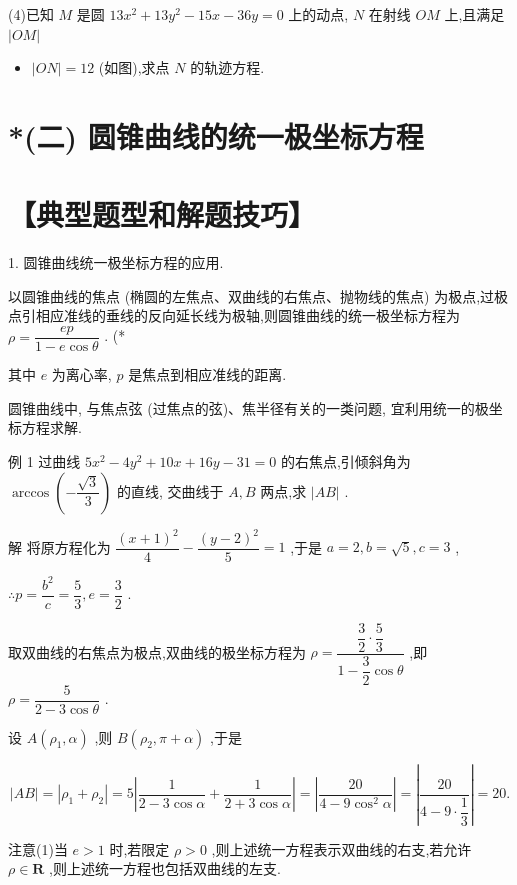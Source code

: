 (4)已知 $M$ 是圆 ${13}{x}^{2} + {13}{y}^{2} - {15x} - {36y} = 0$ 上的动点, $N$ 在射线 ${OM}$ 上,且满足 $\left| {OM}\right|$

\begin{itemize}
\item $\left| {ON}\right|  = {12}$ (如图),求点 $N$ 的轨迹方程.
\end{itemize}

\section*{*(二) 圆锥曲线的统一极坐标方程}

\section*{【典型题型和解题技巧】}

1. 圆锥曲线统一极坐标方程的应用.

以圆锥曲线的焦点 (椭圆的左焦点、双曲线的右焦点、抛物线的焦点) 为极点,过极点引相应准线的垂线的反向延长线为极轴,则圆锥曲线的统一极坐标方程为 $\rho  = \dfrac{ep}{1 - e\cos \theta }$ . (*

其中 $e$ 为离心率, $p$ 是焦点到相应准线的距离.

圆锥曲线中, 与焦点弦 (过焦点的弦)、焦半径有关的一类问题, 宜利用统一的极坐标方程求解.

例 1 过曲线 $5{x}^{2} - 4{y}^{2} + {10x} + {16y} - {31} = 0$ 的右焦点,引倾斜角为 $\arccos \left( {-\dfrac{\sqrt{3}}{3}}\right)$ 的直线, 交曲线于 $A,B$ 两点,求 $\left| {AB}\right|$ .

解 将原方程化为 $\dfrac{{\left( x + 1\right) }^{2}}{4} - \dfrac{{\left( y - 2\right) }^{2}}{5} = 1$ ,于是 $a = 2,b = \sqrt{5},c = 3$ ,

$\therefore p = \dfrac{{b}^{2}}{c} = \dfrac{5}{3},e = \dfrac{3}{2}$ .

取双曲线的右焦点为极点,双曲线的极坐标方程为 $\rho  = \dfrac{\dfrac{3}{2} \cdot  \dfrac{5}{3}}{1 - \dfrac{3}{2}\cos \theta }$ ,即 $\rho  = \dfrac{5}{2 - 3\cos \theta }$ .

设 $A\left( {{\rho }_{1},\alpha }\right)$ ,则 $B\left( {{\rho }_{2},\pi  + \alpha }\right)$ ,于是

\[
\left| {AB}\right|  = \left| {{\rho }_{1} + {\rho }_{2}}\right|  = 5\left| {\dfrac{1}{2 - 3\cos \alpha } + \dfrac{1}{2 + 3\cos \alpha }}\right|  = \left| \dfrac{20}{4 - 9{\cos }^{2}\alpha }\right|  = \left| \dfrac{20}{4 - 9 \cdot  \dfrac{1}{3}}\right|  = {20}.
\]

注意(1)当 $e > 1$ 时,若限定 $\rho  > 0$ ,则上述统一方程表示双曲线的右支,若允许 $\rho  \in  \mathbf{R}$ ,则上述统一方程也包括双曲线的左支.

